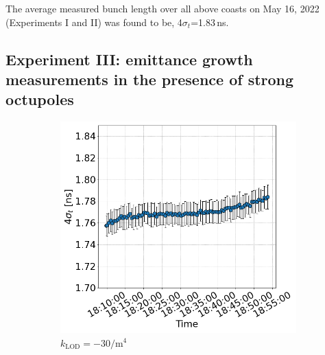  
 The average measured bunch length over all above coasts on May 16, 2022 (Experiments I and II) was found to be, 4$\sigma_t$=1.83\,ns. 
 
 
 

 \subsection{Experiment III: emittance growth measurements in the presence of strong octupoles}\label{subsec:2022_exp3_bunch_length}

 \begin{figure}[htp]
    \centering
    \begin{subfigure}{.45\textwidth}
        \centering
        \includegraphics[width=.95\linewidth]{images/app_c/bunch_length_cc_md_sep_coast6.png}  
        \caption{$k_\mathrm{LOD}=-30 \mathrm{/m^{4}}$}
    \end{subfigure}
    \begin{subfigure}{.45\textwidth}
        \centering

\end{subfigure}
\end{figure}
